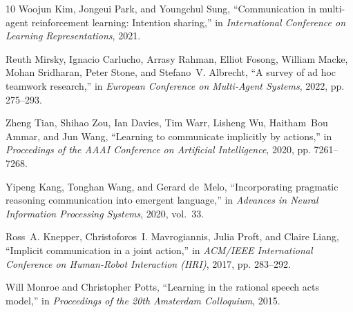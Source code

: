\documentclass{article}
\begin{document}
\begin{thebibliography}{10}
Woojun Kim, Jongeui Park, and Youngchul Sung,
\newblock ``Communication in multi-agent reinforcement learning: Intention sharing,''
\newblock in {\em International Conference on Learning Representations}, 2021.

Reuth Mirsky, Ignacio Carlucho, Arrasy Rahman, Elliot Fosong, William Macke, Mohan Sridharan, Peter Stone, and Stefano~V. Albrecht,
\newblock ``A survey of ad hoc teamwork research,''
\newblock in {\em European Conference on Multi-Agent Systems}, 2022, pp. 275--293.

Zheng Tian, Shihao Zou, Ian Davies, Tim Warr, Lisheng Wu, Haitham~Bou Ammar, and Jun Wang,
\newblock ``Learning to communicate implicitly by actions,''
\newblock in {\em Proceedings of the AAAI Conference on Artificial Intelligence}, 2020, pp. 7261--7268.

Yipeng Kang, Tonghan Wang, and Gerard de~Melo,
\newblock ``Incorporating pragmatic reasoning communication into emergent language,''
\newblock in {\em Advances in Neural Information Processing Systems}, 2020, vol.~33.

Ross~A. Knepper, Christoforos~I. Mavrogiannis, Julia Proft, and Claire Liang,
\newblock ``Implicit communication in a joint action,''
\newblock in {\em ACM/IEEE International Conference on Human-Robot Interaction (HRI)}, 2017, pp. 283--292.

Will Monroe and Christopher Potts,
\newblock ``Learning in the rational speech acts model,''
\newblock in {\em Proceedings of the 20th Amsterdam Colloquium}, 2015.

\end{thebibliography}
\end{document}
